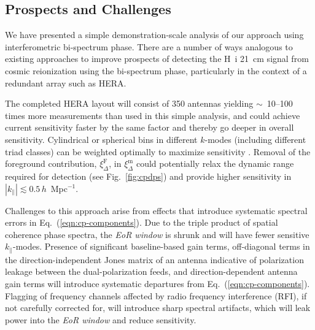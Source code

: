 \documentclass[
reprint,
superscriptaddress,
amsmath,
amssymb,
aps,
prd
]{revtex4-1}
\begin{document}
\subsection{Prospects and Challenges}\label{sec:prospects-challenges}

We have presented a simple demonstration-scale analysis of our approach using interferometric bi-spectrum phase. There are a number of ways analogous to existing approaches to improve prospects of detecting the H~{\sc i} 21~cm signal from cosmic reionization using the bi-spectrum phase, particularly in the context of a redundant array such as HERA. 

The completed HERA layout will consist of 350 antennas yielding $\sim$~10--100 times more measurements than used in this simple analysis, and could achieve current sensitivity faster by the same factor and thereby go deeper in overall sensitivity. Cylindrical or spherical bins in different $k$-modes (including different triad classes) can be weighted optimally to maximize sensitivity \cite{liu14a,liu14b,dil15}. Removal of the foreground contribution, $\xi_\Delta^\textrm{F}$, in $\xi_\Delta^\textrm{m}$ could potentially relax the dynamic range required for detection (see Fig.~\ref{fig:cpdps}) and provide higher sensitivity in $|k_\parallel| \lesssim 0.5\,h$~Mpc$^{-1}$.

Challenges to this approach arise from effects that introduce systematic spectral errors in Eq.~(\ref{eqn:cp-components}). Due to the triple product of spatial coherence phase spectra, the {\it EoR window} is shrunk and will have fewer sensitive $k_\parallel$-modes. Presence of significant baseline-based gain terms, off-diagonal terms in the direction-independent Jones matrix of an antenna indicative of polarization leakage between the dual-polarization feeds, and direction-dependent antenna gain terms will introduce systematic departures from Eq.~(\ref{eqn:cp-components}). Flagging of frequency channels affected by radio frequency interference (RFI), if not carefully corrected for, will introduce sharp spectral artifacts, which will leak power into the {\it EoR window} and reduce sensitivity.
\end{document}
